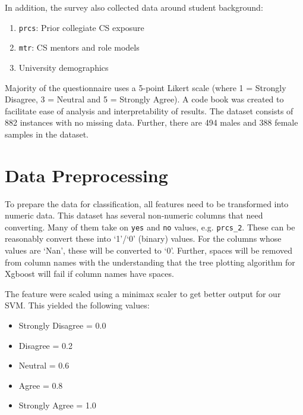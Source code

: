 In addition, the survey also collected data around student background: 

\begin{enumerate}%
\item \texttt{prcs}: Prior collegiate CS exposure
\item \texttt{mtr}: CS mentors and role models
\item University demographics
\end{enumerate}



Majority of the questionnaire uses a 5-point Likert scale (where 1 = Strongly Disagree, 3 = Neutral and 5 = Strongly Agree). A code book was created to facilitate ease of analysis and interpretability of results. The dataset consists of 882 instances with no missing data. Further, there are 494 males and 388 female samples in the dataset. 




\section*{Data Preprocessing}

To prepare the data for classification, all features need to be transformed into numeric data. This dataset has several non-numeric columns that need converting. Many of them take on \texttt{yes} and \texttt{no} values, e.g. \texttt{prcs\_2}. These can be reasonably convert these into `1'/`0' (binary) values. For the columns whose values are `Nan', these will be converted to `0'. Further, spaces will be removed from column names with the understanding that the tree plotting algorithm for Xgboost will fail if column names have spaces. 

The feature were scaled using a minimax scaler to get better output for our SVM. This yielded the following values:
\begin {itemize}
\item Strongly Disagree = 0.0
\item Disagree = 0.2
\item Neutral = 0.6
\item Agree = 0.8
\item Strongly Agree = 1.0
\end{itemize} 



